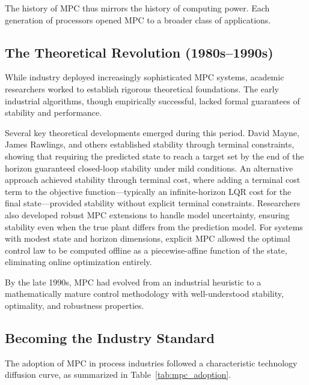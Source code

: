 The history of MPC thus mirrors the history of computing power. Each generation of processors opened MPC to a broader class of applications.

\subsection{The Theoretical Revolution (1980s--1990s)}

While industry deployed increasingly sophisticated MPC systems, academic researchers worked to establish rigorous theoretical foundations. The early industrial algorithms, though empirically successful, lacked formal guarantees of stability and performance.

Several key theoretical developments emerged during this period. David Mayne, James Rawlings, and others established stability through terminal constraints, showing that requiring the predicted state to reach a target set by the end of the horizon guaranteed closed-loop stability under mild conditions. An alternative approach achieved stability through terminal cost, where adding a terminal cost term to the objective function---typically an infinite-horizon LQR cost for the final state---provided stability without explicit terminal constraints. Researchers also developed robust MPC extensions to handle model uncertainty, ensuring stability even when the true plant differs from the prediction model. For systems with modest state and horizon dimensions, explicit MPC allowed the optimal control law to be computed offline as a piecewise-affine function of the state, eliminating online optimization entirely.

By the late 1990s, MPC had evolved from an industrial heuristic to a mathematically mature control methodology with well-understood stability, optimality, and robustness properties.

\subsection{Becoming the Industry Standard}

The adoption of MPC in process industries followed a characteristic technology diffusion curve, as summarized in Table~\ref{tab:mpc_adoption}.


